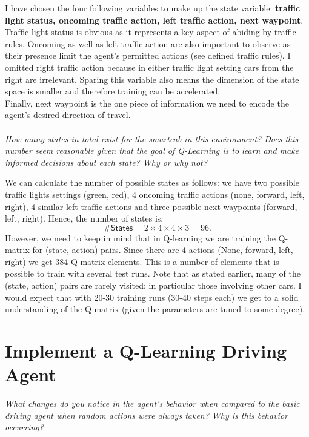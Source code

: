 \documentclass[a4paper,11pt]{article}
\numberwithin{equation}{section}
\numberwithin{figure}{section}
\begin{document}
I have chosen the four following variables to make up the state variable: \textbf{traffic light status, oncoming traffic action, left traffic action, next waypoint}. Traffic light status is obvious as it represents a key aspect of abiding by traffic rules. Oncoming as well as left traffic action are also important to observe as their presence limit the agent's permitted actions (see defined traffic rules). I omitted right traffic action because in either traffic light setting cars from the right are irrelevant. Sparing this variable also means the dimension of the state space is smaller and therefore training can be accelerated. \\
Finally, next waypoint is the one piece of information we need to encode the agent's desired direction of travel. \\ \\


\textit{How many states in total exist for the smartcab in this environment? Does this number seem reasonable given that the goal of Q-Learning is to learn and make informed decisions about each state? Why or why not?}

We can calculate the number of possible states as follows: we have two possible traffic lights settings (green, red), 4 oncoming traffic actions (none, forward, left, right), 4 similar left traffic actions and three possible next waypoints (forward, left, right). Hence, the number of states is:
\begin{equation*}
\mathsf{\# States} = 2  \times 4 \times 4 \times 3 = 96.
\end{equation*}
However, we need to keep in mind that in Q-learning we are training the Q-matrix for (state, action) pairs. Since there are 4 actions (None, forward, left, right) we get 384 Q-matrix elements. This is a number of elements that is possible to train with several test runs. Note that as stated earlier, many of the (state, action) pairs are rarely visited: in particular those involving other cars. I would expect that with 20-30 training runs (30-40 steps each) we get to a solid understanding of the Q-matrix (given the parameters are tuned to some degree).


\section*{\sffamily Implement a Q-Learning Driving Agent}
\textit{What changes do you notice in the agent's behavior when compared to the basic driving agent when random actions were always taken? Why is this behavior occurring?}
\end{document}
